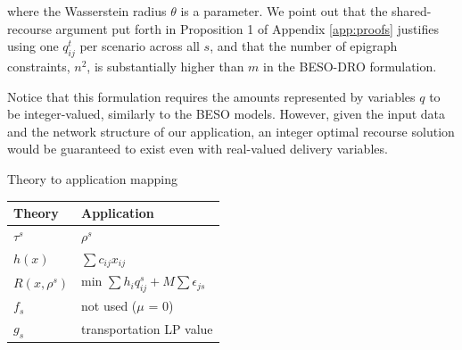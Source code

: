 \documentclass[mnsc,sglanonrev]{informs4}  %
\theoremstyle{remark}\newtheorem{remark}{Remark}
\begin{document}
\noindent where the Wasserstein radius $\theta$ is a parameter. We point out that the shared-recourse argument put forth in Proposition 1 of Appendix \ref{app:proofs} justifies using one $q_{ij}^t$ per scenario across all $s$, and that the number of epigraph constraints, $n^2$, is substantially higher than $m$ in the BESO-DRO formulation.

Notice that this formulation requires the amounts represented by variables $q$ to be integer-valued, similarly to the BESO models. However, given the input data and the network structure of our application, an integer optimal recourse solution would be guaranteed to exist even with real-valued delivery variables.


%
%
%

\begin{table}
	\TABLE
	{Theory to application mapping\label{table:Th2App}}
	{ \begin{tabular}{ll}
			Theory    & Application \\
			\hline
			$\tau^s$  & $\rho^s$ \\
			$h(x)$    & $\sum c_{ij} x_{ij}$\\
			$R(x, \rho^s)$ & min $\sum h_i q_{ij}^s + M \sum \epsilon_{js}$ \\
			$f_s$     & not used ($\mu$ = 0) \\
			$g_s$     & transportation LP value\\
			\hline
	\end{tabular} } 
    {}
\end{table}


\end{document}

